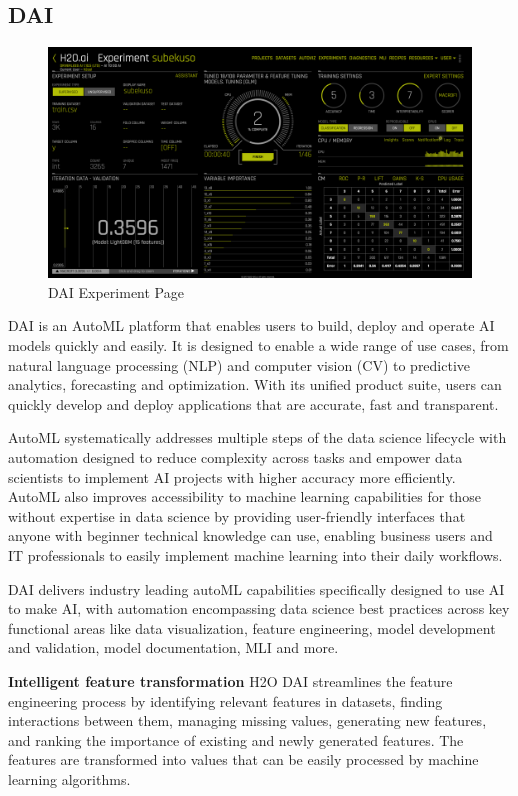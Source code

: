 \documentclass[12pt,a4paper]{report}
\begin{document}
\subsection{ \ac{DAI}}


\begin{figure}[H]
\centering
\includegraphics[width=1\textwidth]{dai.png}
\caption{ \ac{DAI} Experiment Page}
\end{figure}


 \ac{DAI} is an \ac{AutoML} platform that enables users to build, 
deploy and operate AI models quickly and easily. It is designed to enable a wide range of use cases, 
from natural language processing (NLP) and computer vision (CV) to predictive analytics, forecasting 
and optimization. With its unified product suite, users can quickly develop and deploy applications 
that are accurate, fast and transparent.

\ac{AutoML} systematically addresses multiple steps of the data science 
lifecycle with automation designed to reduce complexity across tasks and empower data scientists
to implement AI projects with higher accuracy more efficiently. AutoML also improves accessibility 
to machine learning capabilities for those without expertise in data science by providing 
user-friendly interfaces that anyone with beginner technical knowledge can use, enabling 
business users and IT professionals to easily implement machine learning into their daily workflows.

\ac{DAI} delivers industry leading autoML capabilities specifically designed to use AI to make AI, 
with automation encompassing data science best practices across key functional areas like data 
visualization, feature engineering, model development and validation, model documentation, 
\ac{MLI} and more.

\textbf{Intelligent feature transformation} H2O \ac{DAI} streamlines the feature engineering 
process by identifying relevant features in datasets, finding interactions between them, managing 
missing values, generating new features, and ranking the importance of existing and newly generated 
features. The features are transformed into values that can be easily processed by machine learning 
algorithms.
\end{document}
